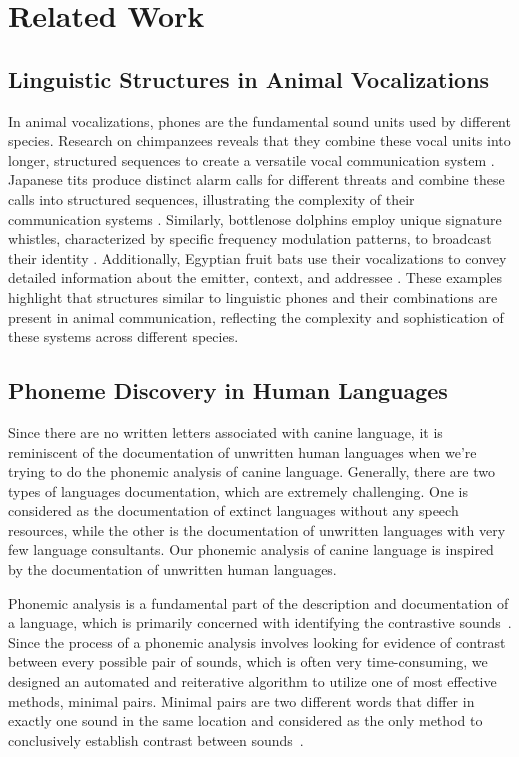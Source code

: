 \section{Related Work}
\label{sec:related}
\subsection{Linguistic Structures in Animal Vocalizations}
In animal vocalizations, phones are the fundamental sound units used by different species. Research on chimpanzees reveals that they combine these vocal units into longer, structured sequences to create a versatile vocal communication system \cite{girard2022chimpanzees}. Japanese tits produce distinct alarm calls for different threats and combine these calls into structured sequences, illustrating the complexity of their communication systems \cite{suzuki2021animal}. Similarly, bottlenose dolphins employ unique signature whistles, characterized by specific frequency modulation patterns, to broadcast their identity \cite{janik2013identifying}. Additionally, Egyptian fruit bats use their vocalizations to convey detailed information about the emitter, context, and addressee \cite{prat2016everyday}. These examples highlight that structures similar to linguistic phones and their combinations are present in animal communication, reflecting the complexity and sophistication of these systems across different species.


\subsection{Phoneme Discovery in Human Languages}
Since there are no written letters associated with canine language, it is reminiscent of the documentation of unwritten human languages when we’re trying to do the phonemic analysis of canine language. Generally, there are two types of languages documentation, which are extremely challenging. One is considered as the documentation of extinct languages without any speech resources, while the other is the documentation of unwritten languages with very few language consultants. Our phonemic analysis of canine language is inspired by the documentation of unwritten human languages.

Phonemic analysis is a fundamental part of the description and documentation of a language, which is primarily concerned with identifying the contrastive sounds~\cite{kempton2014discovering}. Since the process of a phonemic analysis involves looking for evidence of contrast between every possible pair of sounds, which is often very time-consuming, we designed an automated and reiterative algorithm to utilize one of most effective methods, minimal pairs. Minimal pairs are two different words that differ in exactly one sound in the same location and considered as the only method to conclusively establish contrast between sounds~\cite{hayes2011intro}.

